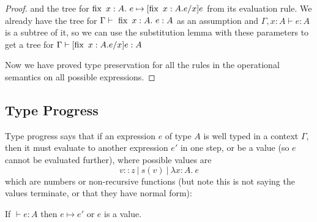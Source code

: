 \begin{proof}
and the tree for $\fix \ x:A . \ e \mapsto [\fix \ x:A. e/x]e$ from its evaluation rule. We already have the tree for $\Gamma \vdash \  \operatorname{fix} \ x:A . \ e : A$ as an assumption and $ \Gamma, x : A \vdash e : A$ is a subtree of it, so we can use the substitution lemma with these parameters to get a tree for $\Gamma \vdash [\operatorname{fix} \ x:A . e/x]e :  A$

\vspace{1cm}

Now we have proved type preservation for all the rules in the operational semantics on all possible expressions.
\end{proof}

\subsection{Type Progress}\label{prog}
Type progress says that if an expression $e$ of type $A$ is well typed in a context $\Gamma$, then it must evaluate to another expression $e'$ in one step, or be a value (so $e$ cannot be evaluated further), where possible values are 
\[v :: z \ | \ s(v) \ | \ \lambda x : A. \ e\]
which are numbers or non-recursive functions (but note this is not saying the values terminate, or that they have normal form):

\vspace{0.5cm}

\begin{thm}
If $\vdash e : A$ then $e \mapsto e'$ or $e$ is a value.
\end{thm}

